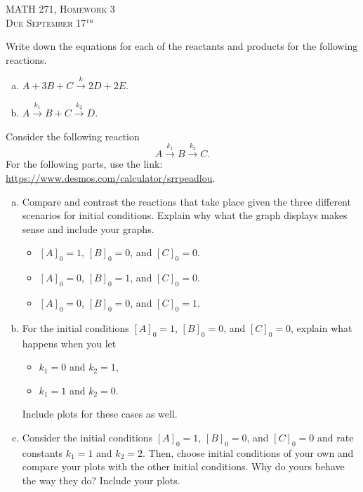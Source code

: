 \documentclass[12pt]{article} %
\begin{document}
\begin{center}
   \textsc{\large MATH 271, Homework 3}\\
   \textsc{Due September 17$^\textrm{th}$}
\end{center}
\vspace{.5cm}

\begin{problem}
Write down the equations for each of the reactants and products for the following reactions.
\begin{enumerate}[(a)]
    \item $A + 3B + C \xrightarrow{k} 2D+2E$.
    \item $A \xrightarrow{k_1} B + C \xrightarrow{k_2} D$.
\end{enumerate}
\end{problem}

\begin{problem}
Consider the following reaction
\[
A \xrightarrow{k_1} B \xrightarrow{k_2} C.
\]
For the following parts, use the link: \url{https://www.desmos.com/calculator/srrpeadlou}.
\begin{enumerate}[(a)]
    \item Compare and contrast the reactions that take place given the three different scenarios for initial conditions. Explain why what the graph displays makes sense and include your graphs.
    \begin{itemize}
        \item $[A]_0 = 1$, $[B]_0=0$, and $[C]_0 =0$.
        \item $[A]_0 = 0$, $[B]_0=1$, and $[C]_0 =0$.
        \item $[A]_0 = 0$, $[B]_0=0$, and $[C]_0 =1$.
    \end{itemize}
    \item For the initial conditions $[A]_0 = 1$, $[B]_0=0$, and $[C]_0 =0$, explain what happens when you let
    \begin{itemize}
        \item $k_1=0$ and $k_2=1$,
        \item $k_1=1$ and $k_2=0$.
    \end{itemize}
    Include plots for these cases as well.
    \item Consider the initial conditions $[A]_0 = 1$, $[B]_0=0$, and $[C]_0 =0$ and rate constants $k_1=1$ and $k_2=2$. Then, choose initial conditions of your own and compare your plots with the other initial conditions. Why do yours behave the way they do? Include your plots.
\end{enumerate}
\end{problem}
\end{document}
